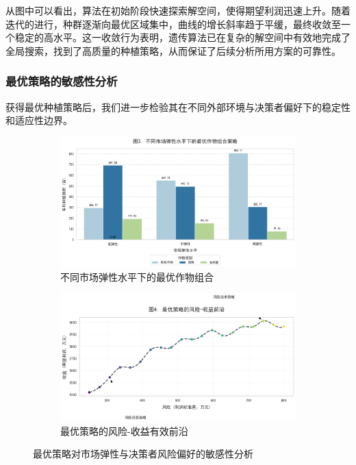 \documentclass[withoutpreface,bwprint]{cumcmthesis} %
\begin{document}
从图中可以看出，算法在初始阶段快速探索解空间，使得期望利润迅速上升。随着迭代的进行，种群逐渐向最优区域集中，曲线的增长斜率趋于平缓，最终收敛至一个稳定的高水平。这一收敛行为表明，遗传算法已在复杂的解空间中有效地完成了全局搜索，找到了高质量的种植策略，从而保证了后续分析所用方案的可靠性。

\subsubsection{最优策略的敏感性分析}

获得最优种植策略后，我们进一步检验其在不同外部环境与决策者偏好下的稳定性和适应性边界。

\begin{figure}[htbp]
	\centering
	\begin{subfigure}{0.48\textwidth}
		\includegraphics[width=\linewidth]{figures/3_1.png}
		\caption{不同市场弹性水平下的最优作物组合}
		\label{fig:3_1}
	\end{subfigure}
	\hfill
	\begin{subfigure}{0.48\textwidth}
		\includegraphics[width=\linewidth]{figures/3_2.png}
		\caption{最优策略的风险-收益有效前沿}
		\label{fig:3_2}
	\end{subfigure}
	\caption{最优策略对市场弹性与决策者风险偏好的敏感性分析}
	\label{fig:sensitivity_3}
\end{figure}
\end{document}
